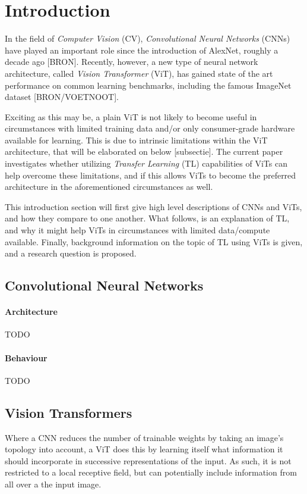 \section{Introduction}
In the field of \textit{Computer Vision} (CV), \textit{Convolutional Neural Networks} (CNNs) have played an important role since the introduction of AlexNet, roughly a decade ago [BRON]. Recently, however, a new type of neural network architecture, called \textit{Vision Transformer} (ViT), has gained state of the art performance on common learning benchmarks, including the famous ImageNet dataset [BRON/VOETNOOT].

Exciting as this may be, a plain ViT is not likely to become useful in circumstances with limited training data and/or only consumer-grade hardware available for learning. This is due to intrinsic limitations within the ViT architecture, that will be elaborated on below [subsectie]. The current paper investigates whether utilizing \textit{Transfer Learning} (TL) capabilities of ViTs can help overcome these limitations, and if this allows ViTs to become the preferred architecture in the aforementioned circumstances as well.

This introduction section will first give high level descriptions of CNNs and ViTs, and how they compare to one another. What follows, is an explanation of TL, and why it might help ViTs in circumstances with limited data/compute available. Finally, background information on the topic of TL using ViTs is given, and a research question is proposed.

\subsection{Convolutional Neural Networks}
\paragraph{Architecture}
TODO

\paragraph{Behaviour}
TODO


\subsection{Vision Transformers}
Where a CNN reduces the number of trainable weights by taking an image's topology into account, a ViT does this by learning itself what information it should incorporate in successive representations of the input. As such, it is not restricted to a local receptive field, but can potentially include information from all over a the input image.

